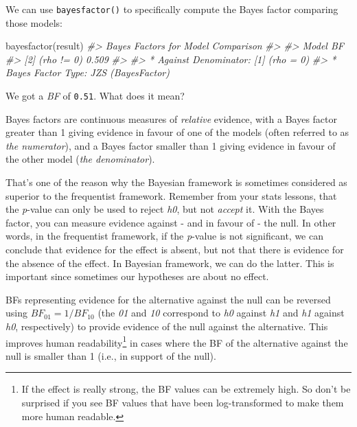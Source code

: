 \documentclass[10pt,a4paper,onecolumn]{article}
\newenvironment{Shaded}{\begin{snugshade}}{\end{snugshade}}
\newcommand{\CommentTok}[1]{\textcolor[rgb]{0.56,0.35,0.01}{\textit{#1}}}
\newcommand{\FunctionTok}[1]{\textcolor[rgb]{0.00,0.00,0.00}{#1}}
\newcommand{\NormalTok}[1]{#1}
\begin{document}
We can use \texttt{bayesfactor()} to specifically compute the Bayes
factor comparing those models:

\begin{Shaded}
\begin{Highlighting}[]
\FunctionTok{bayesfactor}\NormalTok{(result)}
\CommentTok{\#\textgreater{} Bayes Factors for Model Comparison}
\CommentTok{\#\textgreater{} }
\CommentTok{\#\textgreater{}     Model         BF}
\CommentTok{\#\textgreater{} [2] (rho != 0) 0.509}
\CommentTok{\#\textgreater{} }
\CommentTok{\#\textgreater{} * Against Denominator: [1] (rho = 0)}
\CommentTok{\#\textgreater{} *   Bayes Factor Type: JZS (BayesFactor)}
\end{Highlighting}
\end{Shaded}

We got a \emph{BF} of \texttt{0.51}. What does it mean?

Bayes factors are continuous measures of \emph{relative} evidence, with
a Bayes factor greater than 1 giving evidence in favour of one of the
models (often referred to as \emph{the numerator}), and a Bayes factor
smaller than 1 giving evidence in favour of the other model (\emph{the
denominator}).

That's one of the reason why the Bayesian framework is sometimes
considered as superior to the frequentist framework. Remember from your
stats lessons, that the \emph{p}-value can only be used to reject
\emph{h0}, but not \emph{accept} it. With the Bayes factor, you can
measure evidence against - and in favour of - the null. In other words,
in the frequentist framework, if the \emph{p}-value is not significant,
we can conclude that evidence for the effect is absent, but not that
there is evidence for the absence of the effect. In Bayesian framework,
we can do the latter. This is important since sometimes our hypotheses
are about no effect.

BFs representing evidence for the alternative against the null can be
reversed using \(BF_{01}=1/BF_{10}\) (the \emph{01} and \emph{10}
correspond to \emph{h0} against \emph{h1} and \emph{h1} against
\emph{h0}, respectively) to provide evidence of the null against the
alternative. This improves human readability\footnote{If the effect is
  really strong, the BF values can be extremely high. So don't be
  surprised if you see BF values that have been log-transformed to make
  them more human readable.} in cases where the BF of the alternative
against the null is smaller than 1 (i.e., in support of the null).
\end{document}
